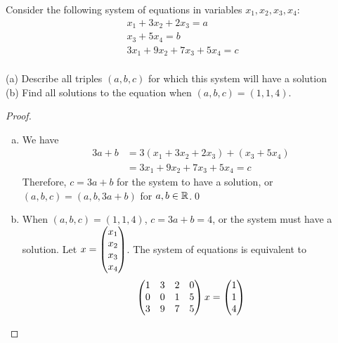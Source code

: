 \begin{question}
	\normalfont
	
	Consider the following system of equations in variables $x_1,x_2,x_3,x_4$:
	\[
	\begin{array}{r}
	x_1 + 3x_2 + 2x_3 = a \\
	x_3 + 5 x_4 = b \\
	3x_1 + 9x_2 + 7x_3 + 5x_4 = c \\
	\end{array}
	\]
	
\noindent (a) Describe all triples $(a,b,c)$ for which this system will have a solution \\


\noindent (b) Find all solutions to the equation when  $(a,b,c)=(1,1,4)$. 
	
	
\end{question}

\begin{proof}
    \renewcommand{\qedsymbol}{$\blacksquare$}
    \begin{enumerate}[(a)]
        \item We have 
        \[
            \begin{aligned}
                3a+b&=3(x_1+3x_2+2x_3)+(x_3+5x_4)\\
                &=3x_1+9x_2+7x_3+5x_4=c
            \end{aligned}
        \]
        Therefore, $c=3a+b$ for the system to have a solution, or $(a,b,c)=(a,b,3a+b)$ for $a,b\in\mathbb R$.\qed
        \item When $(a,b,c)=(1,1,4)$, $c=3a+b=4$, or the system must have a solution. Let $x=\begin{pmatrix} x_1\\ x_2\\x_3 \\ x_4\end{pmatrix}$.
        The system of equations is equivalent to 
        \[
            \begin{aligned}
                \begin{pmatrix}
                    1 & 3 & 2 & 0\\
                    0 & 0 & 1 & 5\\
                    3 & 9 & 7 & 5
                \end{pmatrix}x=\begin{pmatrix} 1\\ 1\\ 4\end{pmatrix}
            \end{aligned}
        \]
    \end{enumerate}
    \renewcommand{\qedsymbol}{}
\end{proof}